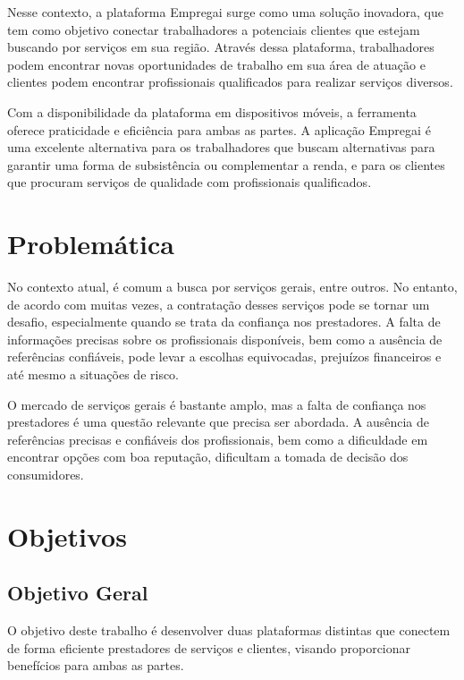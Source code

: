 Nesse contexto, a plataforma Empregai surge como uma solução inovadora, que tem como objetivo conectar trabalhadores a potenciais clientes que estejam buscando por serviços em sua região. Através dessa plataforma, trabalhadores podem encontrar novas oportunidades de trabalho em sua área de atuação e clientes podem encontrar profissionais qualificados para realizar serviços diversos.

Com a disponibilidade da plataforma em dispositivos móveis, a ferramenta oferece praticidade e eficiência para ambas as partes. A aplicação Empregai é uma excelente alternativa para os trabalhadores que buscam alternativas para garantir uma forma de subsistência ou complementar a renda, e para os clientes que procuram serviços de qualidade com profissionais qualificados.

\section{Problemática}

No contexto atual, é comum a busca por serviços gerais, entre outros. No entanto, de acordo com \textcite{FEUP2009} muitas vezes, a contratação desses serviços pode se tornar um desafio, especialmente quando se trata da confiança nos prestadores. A falta de informações precisas sobre os profissionais disponíveis, bem como a ausência de referências confiáveis, pode levar a escolhas equivocadas, prejuízos financeiros e até mesmo a situações de risco.

O mercado de serviços gerais é bastante amplo, mas a falta de confiança nos prestadores é uma questão relevante que precisa ser abordada. A ausência de referências precisas e confiáveis dos profissionais, bem como a dificuldade em encontrar opções com boa reputação, dificultam a tomada de decisão dos consumidores.

\section{Objetivos}



\subsection{Objetivo Geral}
O objetivo deste trabalho é desenvolver duas plataformas distintas que conectem de forma eficiente prestadores de serviços e clientes, visando proporcionar benefícios para ambas as partes.
